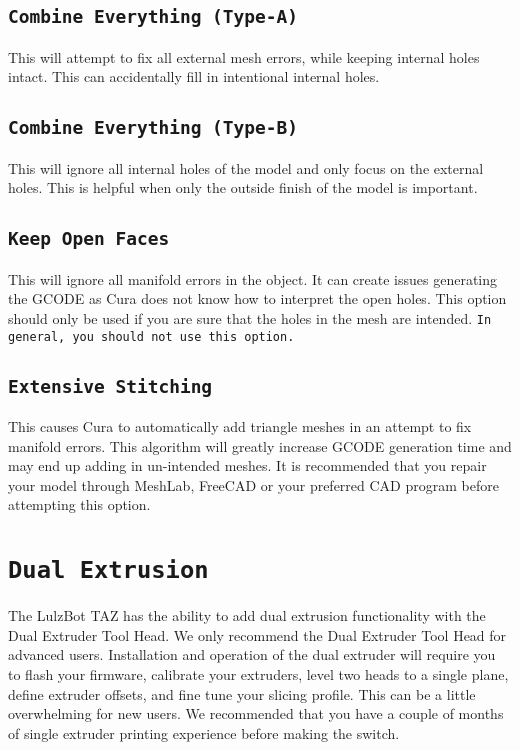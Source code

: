 \subsection{\texttt{Combine Everything (Type-A)}}
This will attempt to fix all external mesh errors, while keeping internal holes intact. This can accidentally fill in intentional internal holes.

\subsection{\texttt{Combine Everything (Type-B)}}
This will ignore all internal holes of the model and only focus on the external holes. This is helpful when only the outside finish of the model is important.

\subsection{\texttt{Keep Open Faces}}
This will ignore all manifold errors in the object. It can create issues generating the GCODE as Cura does not know how to interpret the open holes. This option should only be used if you are sure that the holes in the mesh are intended. \texttt{In general, you should not use this option.}

\subsection{\texttt{Extensive Stitching}}
This causes Cura to automatically add triangle meshes in an attempt to fix manifold errors. This algorithm will greatly increase GCODE generation time and may end up adding in un-intended meshes. It is recommended that you repair your model through MeshLab, FreeCAD or your preferred CAD program before attempting this option.

\section{\texttt{Dual Extrusion}}
The LulzBot TAZ has the ability to add dual extrusion functionality with the Dual Extruder Tool Head. We only recommend the Dual Extruder Tool Head for advanced users. Installation and operation of the dual extruder will require you to flash your firmware, calibrate your extruders, level two heads to a single plane, define extruder offsets, and fine tune your slicing profile. This can be a little overwhelming for new users. We recommended that you have a couple of months of single extruder printing experience before making the switch. 

